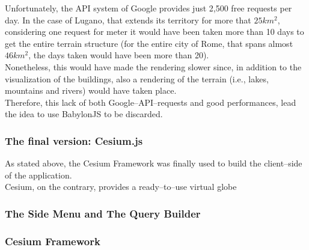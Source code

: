 Unfortunately, the API system of Google provides just 2,500 free requests per day. In the case of Lugano, that extends its territory for more that $25km^2$, considering one request for meter it would have been taken more than 10 days to get the entire terrain structure (for the entire city of Rome, that spans almost $46km^2$, the days taken would have been more than 20).\\

Nonetheless, this would have made the rendering slower since, in addition to the visualization of the buildings, also a rendering of the terrain (i.e., lakes, mountains and rivers) would have taken place.\\
Therefore, this lack of both Google--API--requests and good performances, lead the idea to use BabylonJS to be discarded.
\subsubsection{The final version: Cesium.js}
As stated above, the Cesium Framework was finally used to build the client--side of the application.\\
Cesium, on the contrary, provides a ready--to--use virtual globe
\subsubsection{The Side Menu and The Query Builder}
\subsubsection{Cesium Framework}